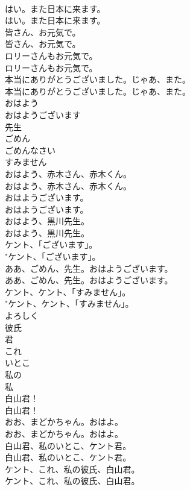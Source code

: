 \documentclass[8pt]{extreport}
\begin{document}
\begin{CJK}{UTF8}{min}
\\	はい。また日本に来ます。	
\\	はい。また日本に来ます。 
\\	皆さん、お元気で。	
\\	皆さん、お元気で。 
\\	ロリーさんもお元気で。	
\\	ロリーさんもお元気で。 
\\	本当にありがとうございました。じゃあ、また。	
\\	本当にありがとうございました。じゃあ、また。 
\\	おはよう
\\	おはようございます
\\	先生
\\	ごめん
\\	ごめんなさい
\\	すみません
\\	おはよう、赤木さん、赤木くん。	
\\	おはよう、赤木さん、赤木くん。 
\\	おはようございます。	
\\	おはようございます。 
\\	おはよう、黒川先生。	
\\	おはよう、黒川先生。 
\\	ケント、「ございます」。	
\\	"ケント、「ございます」。 
\\	ああ、ごめん、先生。おはようございます。	
\\	ああ、ごめん、先生。おはようございます。 
\\	ケント、ケント、「すみません」。	
\\	"ケント、ケント、「すみません」。 
\\	よろしく
\\	彼氏
\\	君
\\	これ
\\	いとこ
\\	私の
\\	私
\\	白山君！	
\\	白山君！ 
\\	おお、まどかちゃん。おはよ。	
\\	おお、まどかちゃん。おはよ。 
\\	白山君、私のいとこ、ケント君。	
\\	白山君、私のいとこ、ケント君。 
\\	ケント、これ、私の彼氏、白山君。	
\\	ケント、これ、私の彼氏、白山君。 

\end{CJK}
\end{document}
